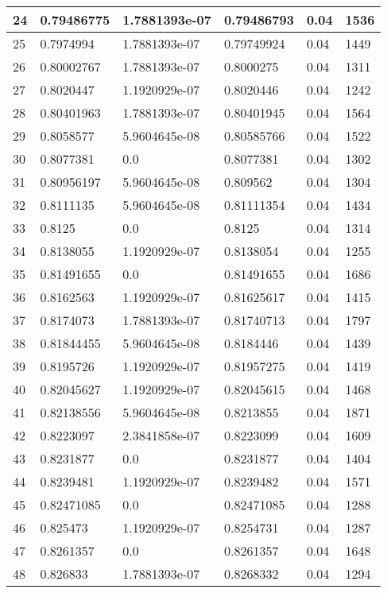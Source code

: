 \begin{longtable}{|l|l|l|l|l|l|}
24 & 0.79486775 & 1.7881393e-07 & 0.79486793 & 0.04 & 1536 \\ \hline 
25 & 0.7974994 & 1.7881393e-07 & 0.79749924 & 0.04 & 1449 \\ \hline 
26 & 0.80002767 & 1.7881393e-07 & 0.8000275 & 0.04 & 1311 \\ \hline 
27 & 0.8020447 & 1.1920929e-07 & 0.8020446 & 0.04 & 1242 \\ \hline 
28 & 0.80401963 & 1.7881393e-07 & 0.80401945 & 0.04 & 1564 \\ \hline 
29 & 0.8058577 & 5.9604645e-08 & 0.80585766 & 0.04 & 1522 \\ \hline 
30 & 0.8077381 & 0.0 & 0.8077381 & 0.04 & 1302 \\ \hline 
31 & 0.80956197 & 5.9604645e-08 & 0.809562 & 0.04 & 1304 \\ \hline 
32 & 0.8111135 & 5.9604645e-08 & 0.81111354 & 0.04 & 1434 \\ \hline 
33 & 0.8125 & 0.0 & 0.8125 & 0.04 & 1314 \\ \hline 
34 & 0.8138055 & 1.1920929e-07 & 0.8138054 & 0.04 & 1255 \\ \hline 
35 & 0.81491655 & 0.0 & 0.81491655 & 0.04 & 1686 \\ \hline 
36 & 0.8162563 & 1.1920929e-07 & 0.81625617 & 0.04 & 1415 \\ \hline 
37 & 0.8174073 & 1.7881393e-07 & 0.81740713 & 0.04 & 1797 \\ \hline 
38 & 0.81844455 & 5.9604645e-08 & 0.8184446 & 0.04 & 1439 \\ \hline 
39 & 0.8195726 & 1.1920929e-07 & 0.81957275 & 0.04 & 1419 \\ \hline 
40 & 0.82045627 & 1.1920929e-07 & 0.82045615 & 0.04 & 1468 \\ \hline 
41 & 0.82138556 & 5.9604645e-08 & 0.8213855 & 0.04 & 1871 \\ \hline 
42 & 0.8223097 & 2.3841858e-07 & 0.8223099 & 0.04 & 1609 \\ \hline 
43 & 0.8231877 & 0.0 & 0.8231877 & 0.04 & 1404 \\ \hline 
44 & 0.8239481 & 1.1920929e-07 & 0.8239482 & 0.04 & 1571 \\ \hline 
45 & 0.82471085 & 0.0 & 0.82471085 & 0.04 & 1288 \\ \hline 
46 & 0.825473 & 1.1920929e-07 & 0.8254731 & 0.04 & 1287 \\ \hline 
47 & 0.8261357 & 0.0 & 0.8261357 & 0.04 & 1648 \\ \hline 
48 & 0.826833 & 1.7881393e-07 & 0.8268332 & 0.04 & 1294 \\ \hline 

\end{longtable}
